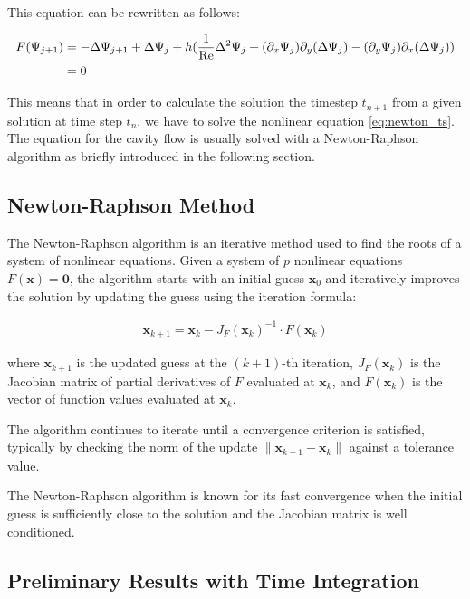 This equation can be rewritten as follows:

\begin{align}
  F(\Psi_{j+1}) & = - \Delta\Psi_{j+1} + \Delta\Psi_j + h (\frac{1}{\mathrm{Re}}\Delta^2 \Psi_j +
    (\partial_x \Psi_j) \partial_y(\Delta \Psi_j) -
    (\partial_y \Psi_j) \partial_x(\Delta \Psi_j)) \nonumber \\
  & =  0 \label{eq:newton_ts}
\end{align}

This means that in order to calculate the solution the timestep $t_{n+1}$ from
a given solution at time step $t_n$, we have to solve the nonlinear equation
\eqref{eq:newton_ts}. The equation for the cavity flow is usually solved with a
Newton-Raphson algorithm \citep{kuhlmann2019} as briefly introduced in the
following section. 

\subsection{Newton-Raphson Method}

The Newton-Raphson algorithm is an iterative method used to find the roots of a
system of nonlinear equations. Given a system of $p$ nonlinear equations
$F(\mathbf{x}) = \mathbf{0}$, the algorithm starts with an initial guess
$\mathbf{x}_0$ and iteratively improves the solution by updating the guess
using the iteration formula:

\begin{align} \mathbf{x}_{k+1} = \mathbf{x}_k - J_F(\mathbf{x}_k)^{-1} \cdot
F(\mathbf{x}_k) \end{align}

where $\mathbf{x}_{k+1}$ is the updated guess at the $(k+1)$-th iteration,
$J_F(\mathbf{x}_k)$ is the Jacobian matrix of partial derivatives of $F$
evaluated at $\mathbf{x}_k$, and $F(\mathbf{x}_k)$ is the vector of function
values evaluated at $\mathbf{x}_k$.

The algorithm continues to iterate until a convergence criterion is satisfied,
typically by checking the norm of the update $\|\mathbf{x}_{k+1} -
\mathbf{x}_k\|$ against a tolerance value.

The Newton-Raphson algorithm is known for its fast convergence when the initial
guess is sufficiently close to the solution and the Jacobian matrix is well
conditioned.

\subsection{Preliminary Results with Time Integration}

